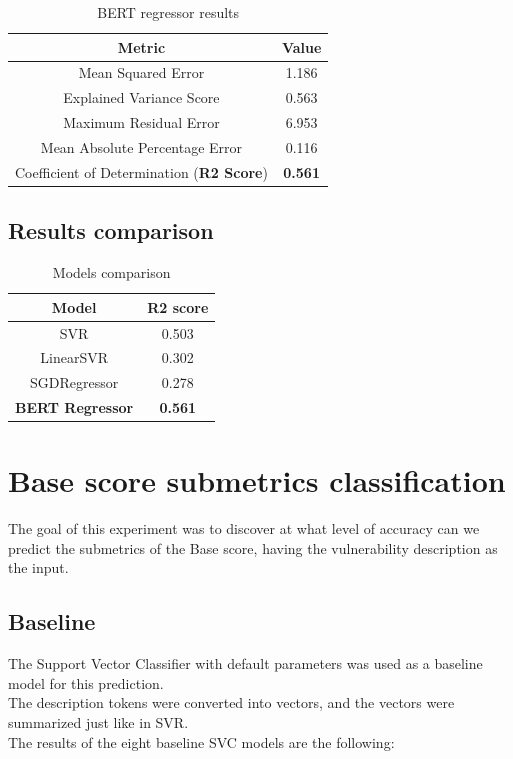 \documentclass[times, utf8, zavrsni, english]{fer}
\begin{document}
\begin{table}[h!]
		\centering
		\begin{tabular}{|| c | c ||} 
			\hline
			Metric & Value \\ [0.5ex] 
			\hline\hline
			Mean Squared Error & 1.186  \\ \hline
			Explained Variance Score & 0.563\\ \hline
			Maximum Residual Error & 6.953 \\ \hline
			Mean Absolute Percentage Error & 0.116 \\ \hline
			Coefficient of Determination (\textbf{R2 Score}) & \textbf{0.561} \\
			\hline
		\end{tabular}
		\caption{BERT regressor results}
		\label{table:9}
\end{table}
\subsection{Results comparison}
\begin{table}[h!]
	\centering
	\begin{tabular}{|| c | c ||} 
		\hline
		Model & R2 score \\ [0.5ex] 
		\hline\hline
		SVR & 0.503  \\ \hline
		LinearSVR & 0.302 \\ \hline
		SGDRegressor & 0.278 \\ \hline
		\textbf{BERT Regressor} & \textbf{0.561} \\ 
	
		\hline
	\end{tabular}
	\caption{Models comparison}
	\label{table:10}
\end{table}

\section{Base score submetrics classification}
The goal of this experiment was to discover at what level of accuracy can we predict the submetrics of the Base score, having the vulnerability description as the input.
\subsection{Baseline}
The Support Vector Classifier with default parameters was used as a baseline model for this prediction.\\
The description tokens were converted into vectors, and the vectors were summarized just like in SVR.\\
The results of the eight baseline SVC models are the following:
\end{document}
